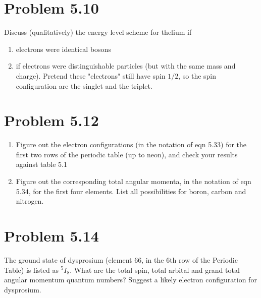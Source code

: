 \documentclass[../main.tex]{subfiles}
\begin{document}
\section{Problem 5.10}

Discuss (qualitatively) the energy level scheme for thelium if
\begin{enumerate}
    \item electrons were identical bosons
    \item if electrons were distinguishable particles (but with the same mass and charge).
        Pretend these "electrons" still have spin $1/2$, so the spin configuration are the singlet and the triplet.
\end{enumerate}

\section{Problem 5.12}

\begin{enumerate}
    \item Figure out the electron configurations (in the notation of eqn 5.33) for the first two rows of the periodic table (up to neon), and check your results against table 5.1
    \item Figure out the corresponding total angular momenta, in the notation of eqn 5.34, for the first four elements.
        List all possibilities for boron, carbon and nitrogen.
\end{enumerate}

\section{Problem 5.14}

The ground state of dysprosium (element 66, in the 6th row of the Periodic Table) is listed as $^5I_8$.
What are the total spin, total arbital and grand total angular momentum quantum numbers?
Suggest a likely electron configuration for dysprosium.
\end{document}
